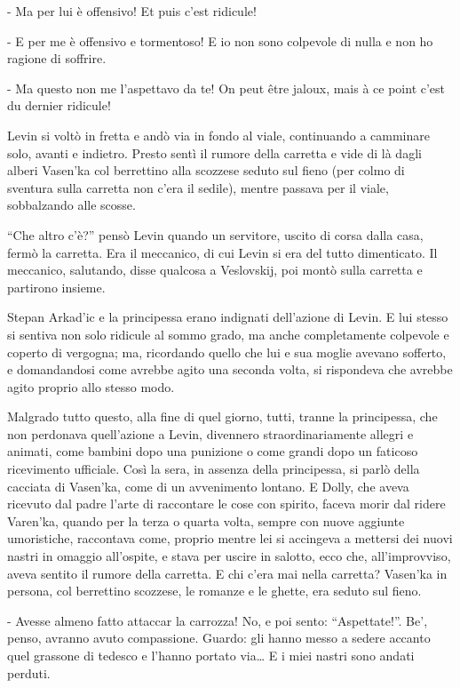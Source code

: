 - Ma per lui è offensivo! Et puis c'est ridicule! 

- E per me è offensivo e tormentoso! E io non sono colpevole di nulla e non ho ragione di soffrire. 

- Ma questo non me l'aspettavo da te! On peut être jaloux, mais à ce point c'est du dernier ridicule! 

Levin si voltò in fretta e andò via in fondo al viale, continuando a camminare solo, avanti e indietro. Presto sentì il rumore della carretta e vide di là dagli alberi Vasen'ka col berrettino alla scozzese seduto sul fieno (per colmo di sventura sulla carretta non c'era il sedile), mentre passava per il viale, sobbalzando alle scosse. 

``Che altro c'è?'' pensò Levin quando un servitore, uscito di corsa dalla casa, fermò la carretta. Era il meccanico, di cui Levin si era del tutto dimenticato. Il meccanico, salutando, disse qualcosa a Veslovskij, poi montò sulla carretta e partirono insieme. 

Stepan Arkad'ic e la principessa erano indignati dell'azione di Levin. E lui stesso si sentiva non solo ridicule al sommo grado, ma anche completamente colpevole e coperto di vergogna; ma, ricordando quello che lui e sua moglie avevano sofferto, e domandandosi come avrebbe agito una seconda volta, si rispondeva che avrebbe agito proprio allo stesso modo. 

Malgrado tutto questo, alla fine di quel giorno, tutti, tranne la principessa, che non perdonava quell'azione a Levin, divennero straordinariamente allegri e animati, come bambini dopo una punizione o come grandi dopo un faticoso ricevimento ufficiale. Così la sera, in assenza della principessa, si parlò della cacciata di Vasen'ka, come di un avvenimento lontano. E Dolly, che aveva ricevuto dal padre l'arte di raccontare le cose con spirito, faceva morir dal ridere Varen'ka, quando per la terza o quarta volta, sempre con nuove aggiunte umoristiche, raccontava come, proprio mentre lei si accingeva a mettersi dei nuovi nastri in omaggio all'ospite, e stava per uscire in salotto, ecco che, all'improvviso, aveva sentito il rumore della carretta. E chi c'era mai nella carretta? Vasen'ka in persona, col berrettino scozzese, le romanze e le ghette, era seduto sul fieno. 

- Avesse almeno fatto attaccar la carrozza! No, e poi sento: ``Aspettate!''. Be', penso, avranno avuto compassione. Guardo: gli hanno messo a sedere accanto quel grassone di tedesco e l'hanno portato via\ldots{} E i miei nastri sono andati perduti. 

